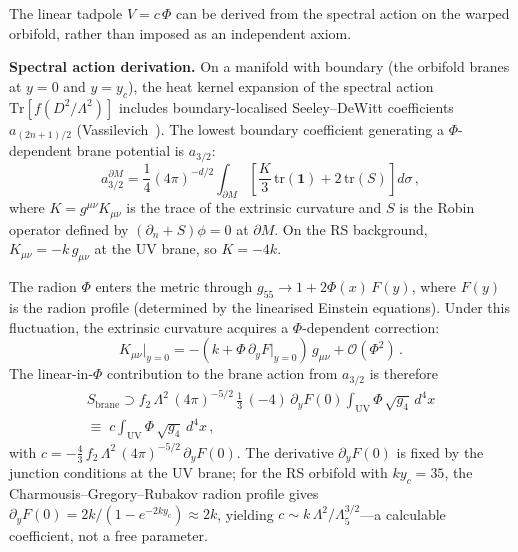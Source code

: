 \begin{remark}
\label{rem:1-A6}
The linear tadpole $V = c\,\Phi$ can be derived from the spectral action on the warped orbifold, rather than imposed as an independent axiom.

\smallskip\noindent\textbf{Spectral action derivation.} On a manifold with boundary (the orbifold branes at $y = 0$ and $y = y_c$), the heat kernel expansion of the spectral action $\mathrm{Tr}[f(D^2/\Lambda^2)]$ includes boundary-localised Seeley--DeWitt coefficients $a_{(2n+1)/2}$ (Vassilevich~\cite{ch4:Vassilevich2003}). The lowest boundary coefficient generating a $\Phi$-dependent brane potential is $a_{3/2}$:
\begin{equation}
\label{eq:1-a32-boundary}
a_{3/2}^{\partial M} = \frac{1}{4}(4\pi)^{-d/2} \int_{\partial M}\! \left[\frac{K}{3}\,\mathrm{tr}(\mathbf{1}) + 2\,\mathrm{tr}(S)\right] d\sigma\,,
\end{equation}
where $K = g^{\mu\nu} K_{\mu\nu}$ is the trace of the extrinsic curvature and $S$ is the Robin operator defined by $(\partial_n + S)\phi = 0$ at $\partial M$. On the RS background, $K_{\mu\nu} = -k\,g_{\mu\nu}$ at the UV brane, so $K = -4k$.

The radion $\Phi$ enters the metric through $g_{55} \to 1 + 2\Phi(x)\,F(y)$, where $F(y)$ is the radion profile (determined by the linearised Einstein equations). Under this fluctuation, the extrinsic curvature acquires a $\Phi$-dependent correction:
\begin{equation}
\label{eq:1-K-radion}
K_{\mu\nu}\big|_{y = 0} = -(k + \Phi\,\partial_y F\big|_{y=0})\,g_{\mu\nu} + \mathcal{O}(\Phi^2)\,.
\end{equation}
The linear-in-$\Phi$ contribution to the brane action from $a_{3/2}$ is therefore
\begin{multline}
\label{eq:1-tadpole-coeff}
S_{\mathrm{brane}} \supset f_2\,\Lambda^2\,(4\pi)^{-5/2}\,\tfrac{1}{3}\,(-4)\,\partial_y F(0)\!\int_{\mathrm{UV}} \Phi\,\sqrt{g_4}\,d^4x \\
  \equiv\; c\!\int_{\mathrm{UV}}\Phi\,\sqrt{g_4}\,d^4x\,,
\end{multline}
with $c = -\tfrac{4}{3}\,f_2\,\Lambda^2\,(4\pi)^{-5/2}\,\partial_y F(0)$. The derivative $\partial_y F(0)$ is fixed by the junction conditions at the UV brane; for the RS orbifold with $ky_c = 35$, the Charmousis--Gregory--Rubakov radion profile gives $\partial_y F(0) = 2k/(1 - e^{-2ky_c}) \approx 2k$, yielding $c \sim k\,\Lambda^2/\Lambda_5^{3/2}$---a calculable coefficient, not a free parameter.


\end{remark}
